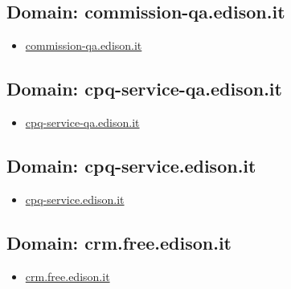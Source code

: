 \documentclass{article}
\begin{document}
    \subsection{Domain: commission-qa.edison.it}
    \begin{itemize}
        
            
                
                \item \href{ http://commission-qa.edison.it/}{ commission-qa.edison.it }
            
        
    \end{itemize}

    \subsection{Domain: cpq-service-qa.edison.it}
    \begin{itemize}
        
            
                
                \item \href{ https://cpq-service-qa.edison.it/}{ cpq-service-qa.edison.it }
            
        
    \end{itemize}

    \subsection{Domain: cpq-service.edison.it}
    \begin{itemize}
        
            
                
                \item \href{ http://cpq-service.edison.it/}{ cpq-service.edison.it }
            
        
    \end{itemize}

    \subsection{Domain: crm.free.edison.it}
    \begin{itemize}
        
            
                
                \item \href{ http://crm.free.edison.it/}{ crm.free.edison.it }
            
        
    \end{itemize}
\end{document}
